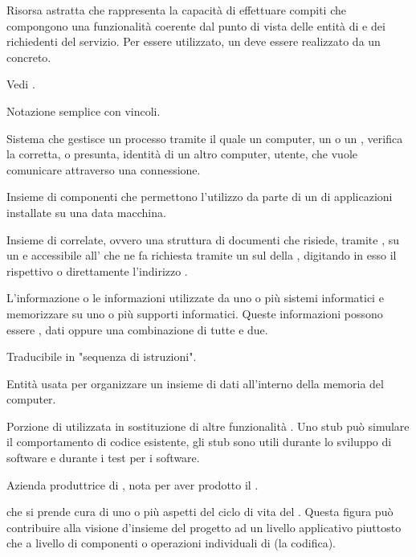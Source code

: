 {
{Risorsa astratta che rappresenta la capacità di effettuare compiti che compongono una funzionalità coerente dal punto di vista delle entità di  e dei richiedenti del servizio. Per essere utilizzato, un  deve essere realizzato da un  concreto.}

{Vedi .}

{Notazione semplice con vincoli.}

{Sistema che gestisce un processo tramite il quale un computer, un  o un , verifica la corretta, o presunta, identità di un altro computer, utente, che vuole comunicare attraverso una connessione.}

{Insieme di componenti  che permettono l'utilizzo da parte di un  di applicazioni installate su una data macchina.}

{Insieme di  correlate, ovvero una struttura  di documenti che risiede, tramite , su un   e accessibile all'  che ne fa richiesta tramite un  sul  della  , digitando in esso il rispettivo  o direttamente l'indirizzo .}

{L'informazione o le informazioni utilizzate da uno o più sistemi informatici e memorizzare su uno o più supporti informatici. Queste informazioni possono essere , dati oppure una combinazione di tutte e due.}

{Traducibile in "sequenza di istruzioni".}

{Entità usata per organizzare un insieme di dati all'interno della memoria del computer.}

{Porzione di  utilizzata in sostituzione di altre funzionalità . Uno stub può simulare il comportamento di codice esistente, gli stub sono utili durante lo sviluppo di software e durante i test per i software.}

{Azienda produttrice di , nota per aver prodotto il  .}

{ che si prende cura di uno o più aspetti del ciclo di vita del . Questa figura può contribuire alla visione d'insieme del progetto ad un livello applicativo piuttosto che a livello di componenti o operazioni individuali di  (la codifica).}


}
